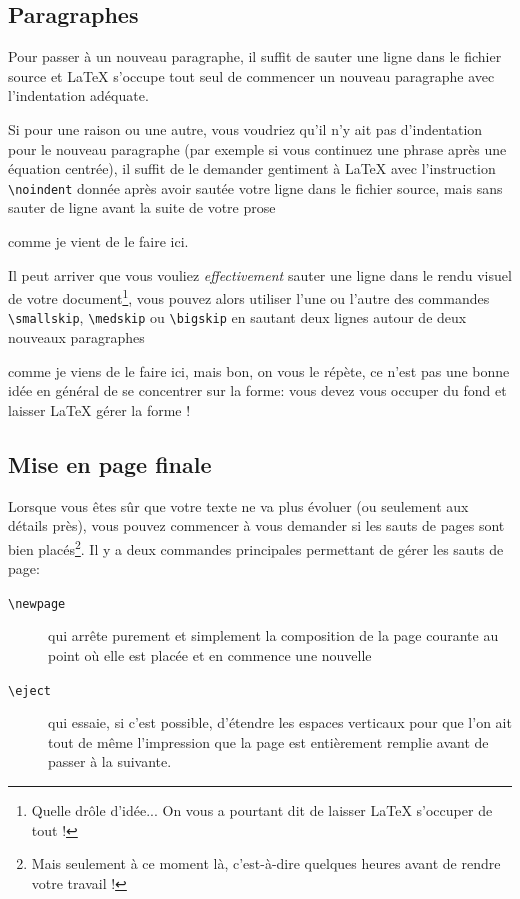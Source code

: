 \documentclass[12pt,a4paper]{article}
\newcommand{\cmd}[1]{\texttt{\textbackslash#1}}
\begin{document}
\subsection{Paragraphes}

Pour passer à un nouveau paragraphe, il suffit de sauter une ligne dans le fichier source et \LaTeX{} s'occupe tout seul de commencer un nouveau paragraphe avec l'indentation adéquate.

Si pour une raison ou une autre, vous voudriez qu'il n'y ait pas d'indentation pour le nouveau paragraphe (par exemple si vous continuez une phrase après une équation centrée), il suffit de le demander gentiment à \LaTeX{} avec l'instruction \cmd{noindent} donnée après avoir sautée votre ligne dans le fichier source, mais sans sauter de ligne avant la suite de votre prose

\noindent comme je vient de le faire ici.

Il peut arriver que vous vouliez \emph{effectivement} sauter une ligne dans le rendu visuel de votre document\footnote{Quelle drôle d'idée... On vous a pourtant dit de laisser \LaTeX{} s'occuper de tout !}, vous pouvez alors utiliser l'une ou l'autre des commandes \cmd{smallskip}, \cmd{medskip} ou \cmd{bigskip} en sautant deux lignes autour de deux nouveaux paragraphes

\bigskip

comme je viens de le faire ici, mais bon, on vous le répète, ce n'est pas une bonne idée en général de se concentrer sur la forme: vous devez vous occuper du fond et laisser \LaTeX{} gérer la forme !

\subsection{Mise en page finale}

Lorsque vous êtes sûr que votre texte ne va plus évoluer (ou seulement aux détails près), vous pouvez commencer à vous demander si les sauts de pages sont bien placés\footnote{Mais seulement à ce moment là, c'est-à-dire quelques heures avant de rendre votre travail !}. Il y a deux commandes principales permettant de gérer les sauts de page: 
\begin{description}	
    \item[\cmd{newpage}] qui arrête purement et simplement la composition de la page courante au point où elle est placée et en commence une nouvelle
    
    \item[\cmd{eject}] qui essaie, si c'est possible, d'étendre les espaces verticaux pour que l'on ait tout de même l'impression que la page est entièrement remplie avant de passer à la suivante.

\end{description}
\end{document}
